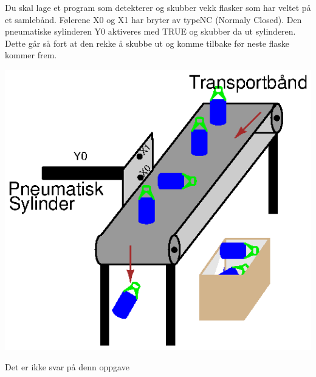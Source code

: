 

Du skal lage et program som detekterer og skubber vekk flasker som
har veltet på et samlebånd. Følerene X0 og X1 har bryter av typeNC (Normaly Closed). Den pneumatiske sylinderen Y0 aktiveres med TRUE og skubber da ut sylinderen. Dette går så fort at den rekke å skubbe ut og komme tilbake før neste flaske kommer frem. 

\includegraphics[width=1\textwidth]{i08002x01.eps}
\vskip 10pt





Det er ikke svar på denn oppgave












